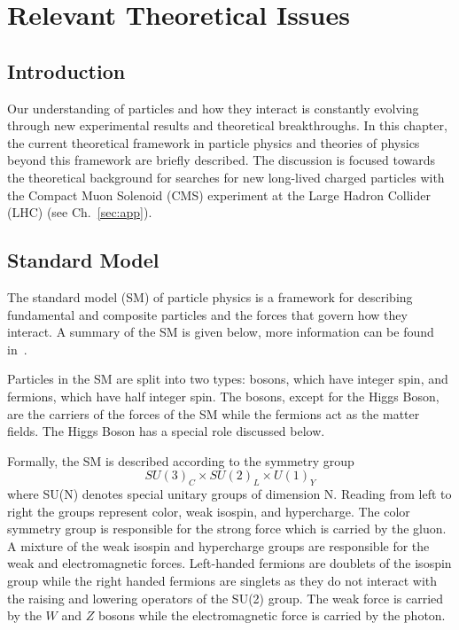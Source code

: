 \chapter{Relevant Theoretical Issues \label{sec:theory}}

\section{Introduction}
Our understanding of particles and how they interact is constantly evolving through new experimental results and theoretical breakthroughs.
In this chapter, the current theoretical framework in particle physics and theories of physics beyond this framework are briefly described.
The discussion is focused towards the theoretical background for searches for new long-lived charged particles with the Compact Muon Solenoid (CMS) experiment
at the Large Hadron Collider (LHC) (see Ch.~\ref{sec:app}).

\section{Standard Model \label{sec:SM}}
The standard model (SM) of particle physics is a framework for describing fundamental and composite particles and the forces that govern how they interact. 
A summary of the SM is given below, more information can be found in~\cite{griffiths2008introduction, Srednicki_2007}.

Particles in the SM are split into two types: bosons, which have integer spin, and fermions, which have half integer spin.
The bosons, except for the Higgs Boson, are the carriers of the forces of the SM while the fermions act as the matter fields.
The Higgs Boson has a special role discussed below.


Formally, the SM is described according to the symmetry group
\begin{equation}
SU(3)_C \times SU(2)_L \times U(1)_Y
\label{eq:SMGroups}
\end{equation}
where SU(N) denotes special unitary groups of dimension N. 
Reading from left to right the groups represent color, weak isospin, and hypercharge. 
The color symmetry group is responsible for the strong force which is carried by the gluon.
A mixture of the weak isospin and hypercharge groups are responsible for the weak and electromagnetic forces. Left-handed fermions are doublets of the
isospin group while the right handed fermions are singlets as they do not interact with the raising and lowering operators of the SU(2) group.
The weak force is carried by the $W$ and $Z$ bosons while the electromagnetic force is carried by the photon.

